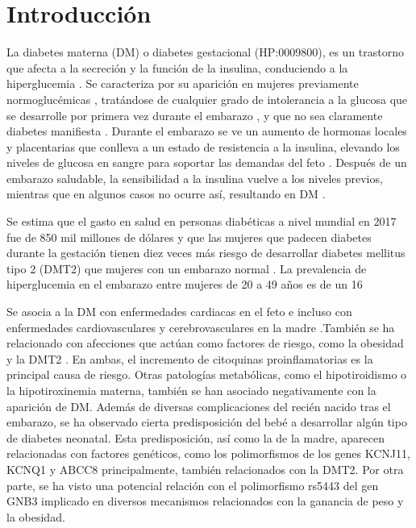 \section{Introducción}

La diabetes materna (DM) o diabetes gestacional (HP:0009800), es un trastorno que afecta a la secreción y la función de la insulina, conduciendo a la hiperglucemia \cite{Rodolaki2023}. Se caracteriza por su aparición en mujeres previamente normoglucémicas \cite{Rodolaki2023}, tratándose de cualquier grado de intolerancia a la glucosa que se desarrolle por primera vez durante el embarazo \cite{ADB2009}, y que no sea claramente diabetes manifiesta \cite{Grazia2020}. Durante el embarazo se ve un aumento de hormonas locales y placentarias que conlleva a un estado de resistencia a la insulina, elevando los niveles de glucosa en sangre para soportar las demandas del feto \cite{Plows2018}. Después de un embarazo saludable, la sensibilidad a la insulina vuelve a los niveles previos, mientras que en algunos casos no ocurre así, resultando en DM \cite{Plows2018}.


Se estima que el gasto en salud en personas diabéticas a nivel mundial en 2017 fue de 850 mil millones de dólares \cite{Cho2018} y que las mujeres que padecen diabetes durante la gestación tienen diez veces más riesgo de desarrollar diabetes mellitus tipo 2 (DMT2) que mujeres con un embarazo normal \cite{Vounzoulaki2020} \cite{You2021}. La prevalencia de hiperglucemia en el embarazo entre mujeres de 20 a 49 años es de un 16%

Se asocia a la DM con enfermedades cardiacas en el feto \cite{Depla2021} e incluso con enfermedades cardiovasculares y cerebrovasculares en la madre \cite{Xie2022}.También se ha relacionado con afecciones que actúan como factores de riesgo, como la obesidad\cite{Shah2011} y la DMT2 \cite{Haroush2004}. En ambas, el incremento de citoquinas proinflamatorias es la principal causa de riesgo\cite{Pantham2015}. Otras patologías metabólicas, como el hipotiroidismo\cite{Gong2016} o la hipotiroxinemia materna\cite{Topaloglu2022}, también se han asociado negativamente con la aparición de DM.
Además de diversas complicaciones del recién nacido tras el embarazo\cite{Depla2021}\cite{Metzger2010}, se ha observado cierta predisposición del bebé a desarrollar algún tipo de diabetes neonatal\cite{Dabelea2000}. Esta predisposición, así como la de la madre, aparecen relacionadas con factores genéticos, como los polimorfismos de los genes KCNJ11, KCNQ1\cite{Ao2015} y ABCC8 \cite{Piccini2018} principalmente, también relacionados con la DMT2\cite{Khan2020}.
Por otra parte, se ha visto una potencial relación con el polimorfismo rs5443 
del gen GNB3\cite{Feng2019} implicado en diversos mecanismos relacionados con la ganancia de peso y la obesidad\cite{Hsiao2013}. 

